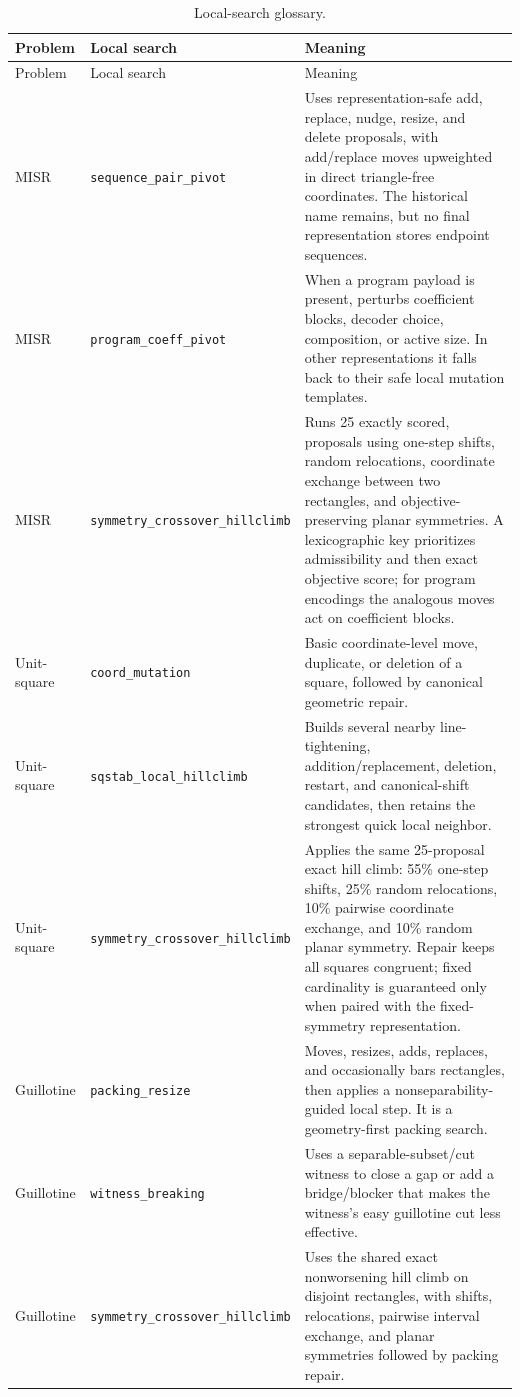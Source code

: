 \documentclass[11pt]{article}
\newcommand{\code}[1]{\texttt{#1}}
\begin{document}
\begin{longtable}{@{}p{}p{}p{}@{}}
\caption{Local-search glossary.}\label{tab:local-search-glossary}\\
\toprule
Problem & Local search & Meaning \\
\midrule
\endfirsthead
\toprule
Problem & Local search & Meaning \\
\midrule
\endhead
\bottomrule
\endfoot
MISR & \code{sequence\_pair\_pivot} & Uses representation-safe add, replace,
nudge, resize, and delete proposals, with add/replace moves upweighted in
direct triangle-free coordinates.  The historical name remains, but no final
representation stores endpoint sequences. \\
MISR & \code{program\_coeff\_pivot} & When a program payload is present,
perturbs coefficient blocks, decoder choice, composition, or active size.  In
other representations it falls back to their safe local mutation templates.
\\
MISR & \code{symmetry\_\allowbreak{}crossover\_\allowbreak{}hillclimb} & Runs 25 exactly scored,
proposals using one-step shifts, random relocations, coordinate exchange
between two rectangles, and objective-preserving planar symmetries.  A
lexicographic key prioritizes admissibility and then exact objective score; for
program encodings the analogous moves act on coefficient blocks. \\
\addlinespace
Unit-square & \code{coord\_mutation} & Basic coordinate-level move, duplicate,
or deletion of a square, followed by canonical geometric repair. \\
Unit-square & \code{sqstab\_local\_hillclimb} & Builds several nearby
line-tightening, addition/replacement, deletion, restart, and canonical-shift
candidates, then retains the strongest quick local neighbor. \\
Unit-square & \code{symmetry\_\allowbreak{}crossover\_\allowbreak{}hillclimb} & Applies the same
25-proposal exact hill climb: 55\% one-step shifts, 25\% random relocations,
10\% pairwise coordinate exchange, and 10\% random planar symmetry.  Repair
keeps all squares congruent; fixed cardinality is guaranteed only when paired
with the fixed-symmetry representation.
\\
\addlinespace
Guillotine & \code{packing\_resize} & Moves, resizes, adds, replaces, and
occasionally bars rectangles, then applies a nonseparability-guided local
step.  It is a geometry-first packing search. \\
Guillotine & \code{witness\_breaking} & Uses a separable-subset/cut witness to
close a gap or add a bridge/blocker that makes the witness's easy guillotine
cut less effective. \\
Guillotine & \code{symmetry\_\allowbreak{}crossover\_\allowbreak{}hillclimb} & Uses the shared exact
nonworsening hill climb on disjoint rectangles, with shifts, relocations,
pairwise interval exchange, and planar symmetries followed by packing repair.
\\
\end{longtable}
\end{document}
